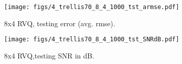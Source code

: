 								\begin{figure}[h!]
								\centering
								\texttt{[image: figs/4\_trellis70\_8\_4\_1000\_tst\_armse.pdf]}
								\caption{8x4 RVQ, testing error (avg. rmse).}
								\label{fig:4_trellis70_8_4_1000_tst_armse}
								\end{figure}

								\begin{figure}[h!]
								\centering
								\texttt{[image: figs/4\_trellis70\_8\_4\_1000\_tst\_SNRdB.pdf]}
								\caption{8x4 RVQ,testing SNR in dB.}
								\label{fig:4_trellis70_8_4_1000_tst_SNRdB}
								\end{figure}